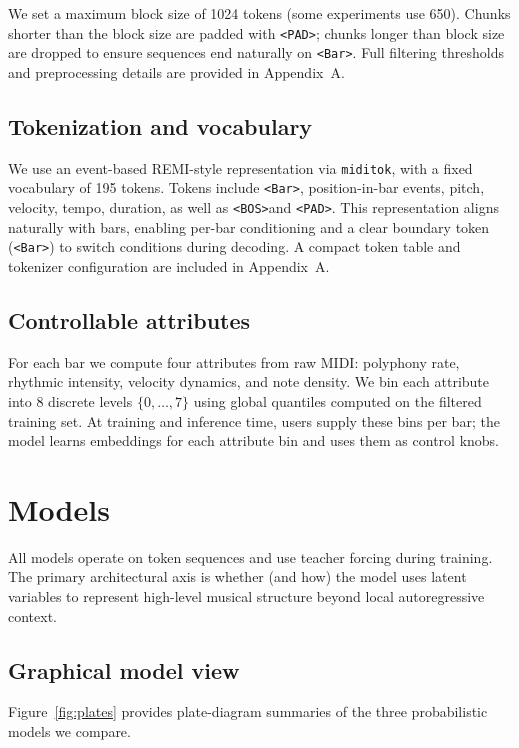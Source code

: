 \documentclass[10pt]{article}
\newcommand{\Bar}{\texttt{<Bar>}}
\newcommand{\PAD}{\texttt{<PAD>}}
\newcommand{\BOS}{\texttt{<BOS>}}
\begin{document}
We set a maximum block size of 1024 tokens (some experiments use 650). Chunks shorter than the block size are padded with \PAD; chunks longer than block size are dropped to ensure sequences end naturally on \Bar. Full filtering thresholds and preprocessing details are provided in Appendix~A.

\subsection{Tokenization and vocabulary}
We use an event-based REMI-style representation via \texttt{miditok}, with a fixed vocabulary of 195 tokens. Tokens include \Bar, position-in-bar events, pitch, velocity, tempo, duration, as well as \BOS and \PAD. This representation aligns naturally with bars, enabling per-bar conditioning and a clear boundary token (\Bar) to switch conditions during decoding. A compact token table and tokenizer configuration are included in Appendix~A.

\subsection{Controllable attributes}
For each bar we compute four attributes from raw MIDI: polyphony rate, rhythmic intensity, velocity dynamics, and note density. We bin each attribute into 8 discrete levels $\{0,\dots,7\}$ using global quantiles computed on the filtered training set. At training and inference time, users supply these bins per bar; the model learns embeddings for each attribute bin and uses them as control knobs.

\section{Models}
All models operate on token sequences and use teacher forcing during training. The primary architectural axis is whether (and how) the model uses latent variables to represent high-level musical structure beyond local autoregressive context.

\subsection{Graphical model view}
Figure~\ref{fig:plates} provides plate-diagram summaries of the three probabilistic models we compare.
\end{document}
